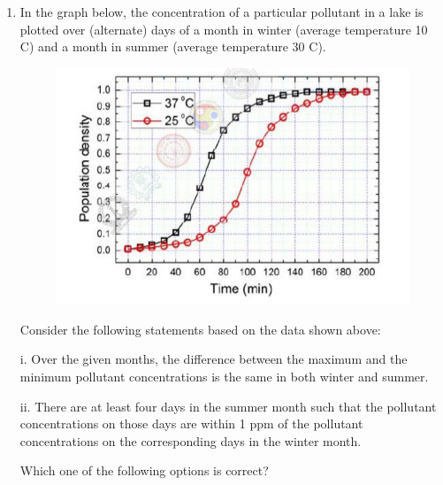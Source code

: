 \documentclass[journal]{IEEEtran}
\begin{document}
\begin{enumerate}[leftmargin=0pt]
    \item In the graph below, the concentration of a particular pollutant in a lake is plotted over (alternate) days of a month in winter (average temperature 10 \degree C) and a month in summer (average temperature 30 \degree C).

     \begin{figure}[h]
    \centering
    \includegraphics[width=0.5\columnwidth]{Figs/image (33).png}
    \caption*{}
    \label{fig:65}
    \end{figure}

    Consider the following statements based on the data shown above:

    i. Over the given months, the difference between the maximum and the minimum pollutant concentrations is the same in both winter and summer.

    ii. There are at least four days in the summer month such that the pollutant concentrations on those days are within 1 ppm of the pollutant concentrations on the corresponding days in the winter month.

    Which one of the following options is correct?
    \begin{enumerate}
    \end{enumerate}
\end{enumerate}
\end{document}

